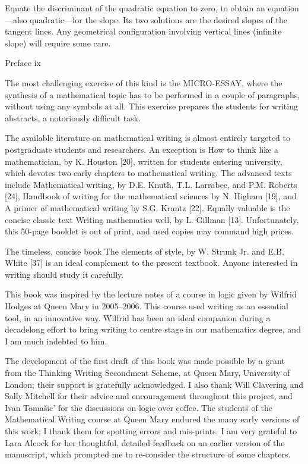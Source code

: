 \documentclass[11pt]{article}
\theoremstyle{plain}
\theoremstyle{definition}
\begin{document}
Equate the discriminant of the quadratic equation to zero, to obtain an equation---also quadratic---for the slope. Its two solutions are the desired slopes of the tangent lines. Any geometrical configuration involving vertical lines (infinite slope) will require some care.

Preface ix

The most challenging exercise of this kind is the MICRO-ESSAY, where the synthesis of a mathematical topic has to be performed in a couple of paragraphs, without using any symbols at all. This exercise prepares the students for writing abstracts, a notoriously difficult task.

The available literature on mathematical writing is almost entirely targeted to postgraduate students and researchers. An exception is How to think like a mathematician, by K. Houston [20], written for students entering university, which devotes two early chapters to mathematical writing. The advanced texts include Mathematical writing, by D.E. Knuth, T.L. Larrabee, and P.M. Roberts [24], Handbook of writing for the mathematical sciences by N. Higham [19], and A primer of mathematical writing by S.G. Krantz [22]. Equally valuable is the concise classic text Writing mathematics well, by L. Gillman [13]. Unfortunately, this 50-page booklet is out of print, and used copies may command high prices.

The timeless, concise book The elements of style, by W. Strunk Jr. and E.B. White [37] is an ideal complement to the present textbook. Anyone interested in writing should study it carefully.

This book was inspired by the lecture notes of a course in logic given by Wilfrid Hodges at Queen Mary in 2005--2006. This course used writing as an essential tool, in an innovative way. Wilfrid has been an ideal companion during a decadelong effort to bring writing to centre stage in our mathematics degree, and I am much indebted to him.

The development of the first draft of this book was made possible by a grant from the Thinking Writing Secondment Scheme, at Queen Mary, University of London; their support is gratefully acknowledged. I also thank Will Clavering and Sally Mitchell for their advice and encouragement throughout this project, and Ivan Tomašic' for the discussions on logic over coffee. The students of the Mathematical Writing course at Queen Mary endured the many early versions of this work; I thank them for spotting errors and mis-prints. I am very grateful to Lara Alcock for her thoughtful, detailed feedback on an earlier version of the manuscript, which prompted me to re-consider the structure of some chapters.
\end{document}
